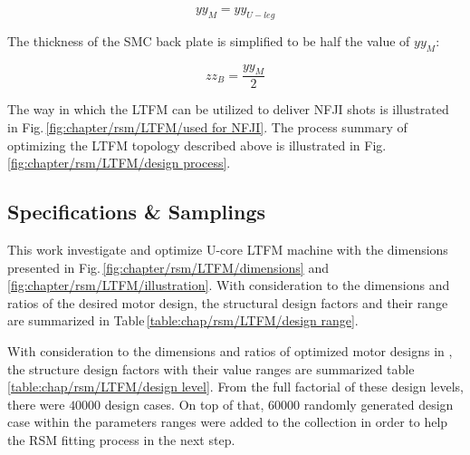         
        \begin{equation}
            yy_M=yy_{U-leg}
            \label{eq:chap/rsm/LTFM/ym is yuleg}
        \end{equation}
        
        
        The thickness of the \acs{SMC} back plate is simplified to be half the value of $yy_{M}$:
        
        
        \begin{equation}
            zz_B=\frac{yy_M}{2}
            \label{eq:chap/rsm/LTFM/zb is half of ym}
        \end{equation}
        
        
        The way in which the \acs{LTFM} can be utilized to deliver \acs{NFJI} shots is illustrated in Fig.\,\ref{fig:chapter/rsm/LTFM/used for NFJI}. The process summary of optimizing the \acs{LTFM} topology described above is illustrated in Fig.\,\ref{fig:chapter/rsm/LTFM/design process}.
        

        \subsection{Specifications \& Samplings}    \label{Chapter:RSM/LTFM/spec}
        
            
            This work investigate and optimize U-core \acs{LTFM} machine with the dimensions presented in Fig.\,\ref{fig:chapter/rsm/LTFM/dimensions} and \ref{fig:chapter/rsm/LTFM/illustration}. With consideration to the dimensions and ratios of the desired motor design, the structural design factors and their range are summarized in Table\,\ref{table:chap/rsm/LTFM/design range}. 
            
            
            With consideration to the dimensions and ratios of optimized motor designs in \cite{Kremers2015}, the structure design factors with their value ranges are summarized table\,\ref{table:chap/rsm/LTFM/design level}. From the full factorial of these design levels, there were $40000$ design cases. On top of that, $60000$ randomly generated design case within the parameters ranges were added to the collection in order to help the \acs{RSM} fitting process in the next step.
            
